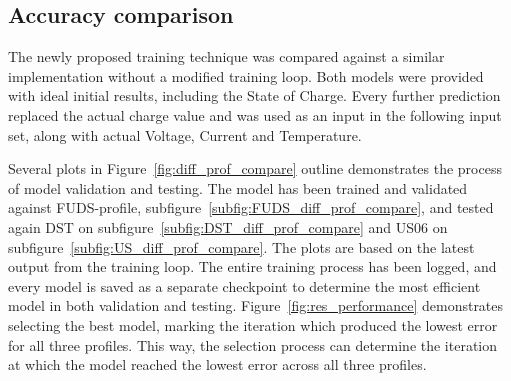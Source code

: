 \subsection{Accuracy comparison}
    The newly proposed training technique was compared against a similar implementation without a modified training loop.
    Both models were provided with ideal initial results, including the State of Charge.
    Every further prediction replaced the actual charge value and was used as an input in the following input set, along with actual Voltage, Current and Temperature.
    
    Several plots in Figure~\ref{fig:diff_prof_compare} outline demonstrates the process of model validation and testing.
    The model has been trained and validated against FUDS-profile, subfigure~\ref{subfig:FUDS_diff_prof_compare}, and tested again DST on subfigure~\ref{subfig:DST_diff_prof_compare} and US06 on subfigure~\ref{subfig:US_diff_prof_compare}.
    The plots are based on the latest output from the training loop.
    The entire training process has been logged, and every model is saved as a separate checkpoint to determine the most efficient model in both validation and testing.
    Figure~\ref{fig:res_performance} demonstrates selecting the best model, marking the iteration which produced the lowest error for all three profiles.
    This way, the selection process can determine the iteration at which the model reached the lowest error across all three profiles. 

